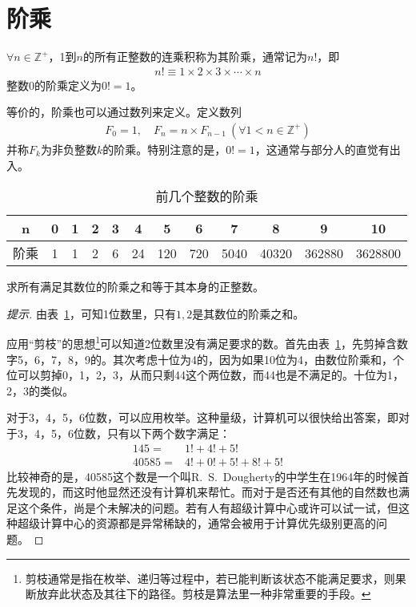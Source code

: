 \section{阶乘}
\label{sec:factorial}

\begin{definition}
  $\forall n\in\mathbb{Z}^+$，1到$n$的所有正整数的连乘积称为其阶乘，通常记为$n!$，即
  \begin{align*}
    n!\equiv 1\times 2\times 3\times \cdots\times n
  \end{align*}
  整数0的阶乘定义为$0!=1$。
\end{definition}

等价的，阶乘也可以通过数列来定义。定义数列
\begin{align*}
  F_0=1, \quad F_{n} = n\times F_{n-1}\ (\forall 1<n\in\mathbb{Z}^+)
\end{align*}
并称$F_k$为非负整数$k$的阶乘。特别注意的是，$0!=1$，这通常与部分人的直觉有出入。

\begin{table}[htbp]
  \centering
  \caption{前几个整数的阶乘}
  \label{tab:factorial-of-first-n-numbers}
  \begin{tabular}{c|ccccccccccc}
    \hline
    n   & 0 & 1 & 2 & 3 & 4  & 5    & 6   & 7 &    8 & 9 & 10\\ \hline
    阶乘 & 1 & 1 & 2 & 6 & 24 & 120 & 720 & 5040 & 40320 & 362880 & 3628800\\
    \hline
  \end{tabular}
\end{table}

\begin{example}
  求所有满足其数位的阶乘之和等于其本身的正整数。
\end{example}
\begin{proof}[提示]
  由表~\ref{tab:factorial-of-first-n-numbers}，可知1位数里，只有$1,2$是其数位的阶乘之和。

  应用“剪枝”的思想\footnote{剪枝通常是指在枚举、递归等过程中，若已能判断该状态不能满足要求，则果断放弃此状态及其往下的路径。剪枝是算法里一种非常重要的手段。}可以知道2位数里没有满足要求的数。首先由表~\ref{tab:factorial-of-first-n-numbers}，先剪掉含数字5，6，7，8，9的。其次考虑十位为4的，因为如果10位为4，由数位阶乘和，个位可以剪掉0，1，2，3，从而只剩44这个两位数，而44也是不满足的。十位为1，2，3的类似。

  对于3，4，5，6位数，可以应用枚举。这种量级，计算机可以很快给出答案，即对于3，4，5，6位数，只有以下两个数字满足：
  \begin{align*}
      145 ={}& 1! + 4! + 5!\\
    40585 ={}& 4! + 0! + 5! + 8! + 5!
  \end{align*}
  比较神奇的是，40585这个数是一个叫R.~S.~Dougherty的中学生在1964年的时候首先发现的，而这时他显然还没有计算机来帮忙。而对于是否还有其他的自然数也满足这个条件，尚是个未解决的问题。若有人有超级计算中心或许可以试一试，但这种超级计算中心的资源都是异常稀缺的，通常会被用于计算优先级别更高的问题。
\end{proof}

